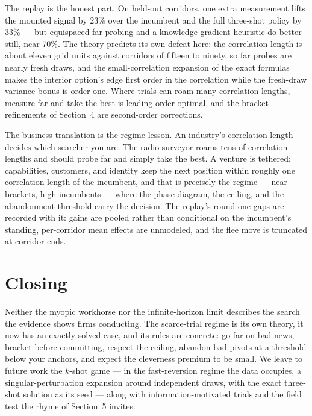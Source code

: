 \documentclass[11pt]{article}
\theoremstyle{itheads}
\begin{document}
The replay is the honest part. On held-out corridors, one extra
measurement lifts the mounted signal by 23\% over the incumbent and
the full three-shot policy by 33\% --- but equispaced far probing and
a knowledge-gradient heuristic do better still, near 70\%. The theory
predicts its own defeat here: the correlation length is about eleven
grid units against corridors of fifteen to ninety, so far probes are
nearly fresh draws, and the small-correlation expansion of the exact
formulas makes the interior option's edge first order in the
correlation while the fresh-draw variance bonus is order one. Where
trials can roam many correlation lengths, measure far and take the
best is leading-order optimal, and the bracket refinements of
Section~4 are second-order corrections.

The business translation is the regime lesson. An industry's
correlation length decides which searcher you are. The radio surveyor
roams tens of correlation lengths and should probe far and simply take
the best. A venture is tethered: capabilities, customers, and identity
keep the next position within roughly one correlation length of the
incumbent, and that is precisely the regime --- near brackets, high
incumbents --- where the phase diagram, the ceiling, and the
abandonment threshold carry the decision. The replay's round-one gaps
are recorded with it: gains are pooled rather than conditional on the
incumbent's standing, per-corridor mean effects are unmodeled, and the
flee move is truncated at corridor ends.

\section{Closing}

Neither the myopic workhorse nor the infinite-horizon limit describes
the search the evidence shows firms conducting. The scarce-trial regime
is its own theory, it now has an exactly solved case, and its rules are
concrete: go far on bad news, bracket before committing, respect the
ceiling, abandon bad pivots at a threshold below your anchors, and
expect the cleverness premium to be small. We leave to future work the $k$-shot game --- in the fast-reversion
regime the data occupies, a singular-perturbation expansion around
independent draws, with the exact three-shot solution as its seed ---
along with information-motivated trials and the field test the rhyme
of Section~5 invites.
\end{document}
